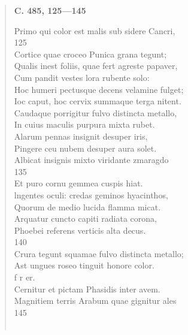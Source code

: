 \documentclass[11pt, a4paper]{report}
\begin{document}
\begin{verse}
     \marginpar{[26]} \begin{center} \textbf{C. 485, 125—145} \end{center}Primo qui color est malis sub sidere Cancri, \\ 125 \\ Cortice quae croceo Punica grana tegunt; \\ Qualis inest foliis, quae fert agreste papaver, \\ Cum pandit vestes lora rubente solo: \\ Hoc humeri pectusque decens velamine fulget; \\ Ioc caput, hoc cervix summaque terga nitent. \\ Caudaque porrigitur fulvo distincta metallo, \\ In cuius maculis purpura mixta rubet. \\ Alarum pennas insignit desuper iris, \\ Pingere ceu nubem desuper aura solet. \\ Albicat insignis mixto viridante zmaragdo \\ 135 \\ Et puro cornu gemmea cuspis hiat. \\ lngentes oculi: credas geminos hyacinthos, \\ Quorum de medio lucida flamma micat. \\ Arquatur cuncto capiti radiata corona, \\ Phoebei referens verticis alta decus. \\ 140 \\ Crura tegunt squamae fulvo distincta metallo; \\ Ast ungues roseo tinguit honore color. \\ f r er. \\ Cernitur et pictam Phasidis inter avem. \\ Magnitiem terris Arabum quae gignitur ales \\ 145 \\ 
        ﻿\pagebreak 

\end{verse}
\end{document}
